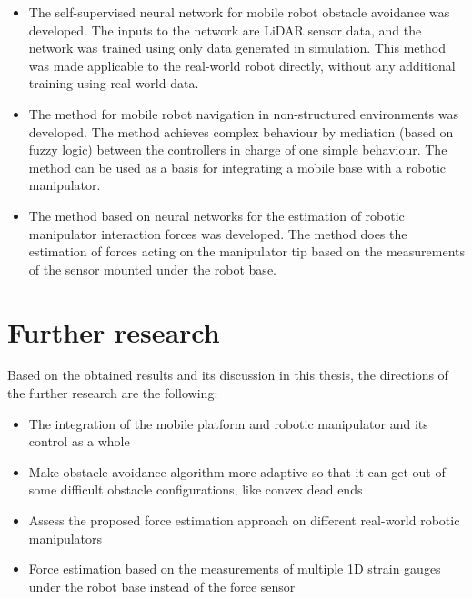 \begin{itemize}
    \item The self-supervised neural network for mobile robot obstacle avoidance was developed. The inputs to the network are LiDAR sensor data, and the network was trained using only data generated in simulation. This method was made applicable to the real-world robot directly, without any additional training using real-world data.
    \item The method for mobile robot navigation in non-structured environments was developed. The method achieves complex behaviour by mediation (based on fuzzy logic) between the controllers in charge of one simple behaviour. The method can be used as a basis for integrating a mobile base with a robotic manipulator.
    \item The method based on neural networks for the estimation of robotic manipulator interaction forces was developed. The method does the estimation of forces acting on the manipulator tip based on the measurements of the sensor mounted under the robot base.
\end{itemize}

\section{Further research}

Based on the obtained results and its discussion in this thesis, the directions of the further research are the following:

\begin{itemize}
    \item The integration of the mobile platform and robotic manipulator and its control as a whole
    \item Make obstacle avoidance algorithm more adaptive so that it can get out of some difficult obstacle configurations, like convex dead ends
    \item Assess the proposed force estimation approach on different real-world robotic manipulators
    \item Force estimation based on the measurements of multiple 1D strain gauges under the robot base instead of the force sensor 
\end{itemize}



\newpage